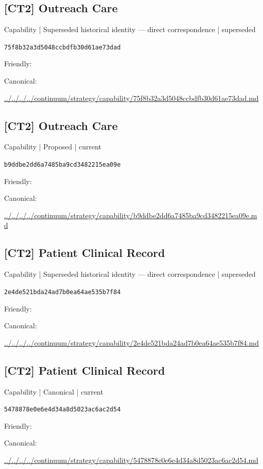 \documentclass[10pt,a4paper]{article}
\begin{document}
\subsection*{[CT2] Outreach Care}
{\small Capability | Superseded historical identity — direct correspondence | superseded}\par
\texttt{75f8b32a3d5048ccbdfb30d61ae73dad}\par
Friendly: \par
Canonical: \par
{\footnotesize\url{../../../../continuum/strategy/capability/75f8b32a3d5048ccbdfb30d61ae73dad.md}}\par
\subsection*{[CT2] Outreach Care}
{\small Capability | Proposed | current}\par
\texttt{b9ddbe2dd6a7485ba9cd3482215ea09e}\par
Friendly: \par
Canonical: \par
{\footnotesize\url{../../../../continuum/strategy/capability/b9ddbe2dd6a7485ba9cd3482215ea09e.md}}\par
\subsection*{[CT2] Patient Clinical Record}
{\small Capability | Superseded historical identity — direct correspondence | superseded}\par
\texttt{2e4de521bda24ad7b0ea64ae535b7f84}\par
Friendly: \par
Canonical: \par
{\footnotesize\url{../../../../continuum/strategy/capability/2e4de521bda24ad7b0ea64ae535b7f84.md}}\par
\subsection*{[CT2] Patient Clinical Record}
{\small Capability | Canonical | current}\par
\texttt{5478878e0e6e4d34a8d5023ac6ac2d54}\par
Friendly: \par
Canonical: \par
{\footnotesize\url{../../../../continuum/strategy/capability/5478878e0e6e4d34a8d5023ac6ac2d54.md}}\par
\end{document}
